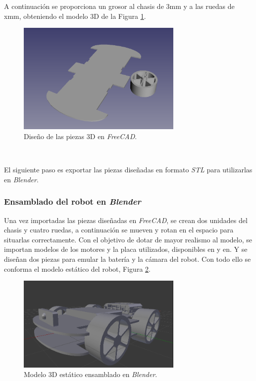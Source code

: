 A continuación se proporciona un grosor al chasis de 3mm y a las ruedas de xmm, obteniendo el modelo 3D de la Figura \ref{fig:design3Dfreecad}.\\

\begin{figure} [h!]
	\begin{center}
		\includegraphics[width=8cm]{figs/freecad}
	\end{center}
	\caption{Diseño de las piezas 3D en \textit{FreeCAD}.}
	\label{fig:design3Dfreecad}
\end{figure}\

El siguiente paso es exportar las piezas diseñadas en formato \textit{STL} para utilizarlas en \textit{Blender}.\\

\subsubsection{Ensamblado del robot en \textit{Blender}}

Una vez importadas las piezas diseñadas en \textit{FreeCAD}, se crean dos unidades del chasis y cuatro ruedas, a continuación se mueven y rotan en el espacio para situarlas
correctamente. Con el objetivo de dotar de mayor realismo al modelo, se importan modelos de los motores y la placa utilizados, disponibles en y en. Y se diseñan dos piezas para
emular la batería y la cámara del robot. Con todo ello se conforma el modelo estático del robot, Figura \ref{fig:blendermodel}.\\

\begin{figure} [h!]
	\begin{center}
		\includegraphics[width=8cm]{figs/blenderModel}
	\end{center}
	\caption{Modelo 3D estático ensamblado en \textit{Blender}.}
	\label{fig:blendermodel}
\end{figure}\

